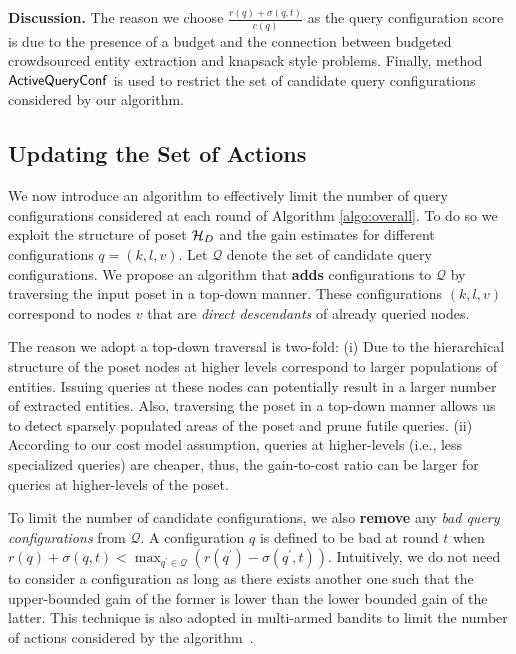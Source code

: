 \vspace{2pt}\noindent\textbf{Discussion.} The reason we choose $\frac{r(q) + \sigma(q,t)}{c(q)}$ as the query configuration score is due to the presence of a budget and the connection between budgeted crowdsourced entity extraction and knapsack style problems. Finally, method ${\sf ActiveQueryConf}$ is used to restrict the set of candidate query configurations considered by our algorithm. 

\subsection{Updating the Set of Actions}
\label{sec:badactions}
We now introduce an algorithm to effectively limit the number of query configurations considered at each round of Algorithm \ref{algo:overall}. To do so we exploit the structure of poset $\mathcal{H}_D$ and the gain estimates for different configurations $q = (k,l,v)$. Let $\mathcal{Q}$ denote the set of candidate query configurations. We propose an algorithm that {\bf adds} configurations to $\mathcal{Q}$ by traversing the input poset in a top-down manner. These configurations $(k,l,v)$ correspond to nodes $v$ that are {\em direct descendants} of already queried nodes. 

The reason we adopt a top-down traversal is two-fold: (i) Due to the hierarchical structure of the poset nodes at higher levels correspond to larger populations of entities. Issuing queries at these nodes can potentially result in a larger number of extracted entities. Also, traversing the poset in a top-down manner allows us to detect sparsely populated areas of the poset and prune futile queries. (ii) According to our cost model assumption, queries at higher-levels (i.e., less specialized queries) are cheaper, thus, the gain-to-cost ratio can be larger for queries at higher-levels of the poset.

To limit the number of candidate configurations, we also {\bf remove} any {\em bad query configurations} from $\mathcal{Q}$. A configuration $q$ is defined to be bad at round $t$ when $r(q) + \sigma(q,t) < \max_{q^{\prime} \in \mathcal{Q}} (r(q^{\prime}) - \sigma(q^{\prime},t))$. Intuitively, we do not need to consider a configuration as long as there exists another one such that the upper-bounded gain of the former is lower than the lower bounded gain of the latter. This technique is also adopted in multi-armed bandits to limit the number of actions considered by the algorithm~\cite{EvenDar06actionelimination}. 

